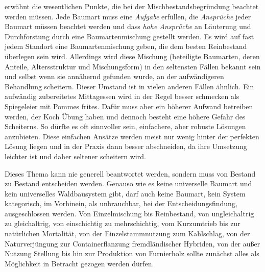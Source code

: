 \documentclass[twocolumn]{scrartcl}
\begin{document}
\citet[S.~218\,f.]{wiedemann1951Ertragskunde} erwähnt die wesentlichen Punkte,
die bei der Mischbestandsbegründung beachtet werden müssen. Jede Baumart muss
eine \emph{Aufgabe} erfüllen, die \emph{Ansprüche} jeder Baumart müssen beachtet
werden und dass \emph{hohe Ansprüche} an Läuterung und Durchforstung durch eine
Baumartenmischung gestellt werden. Es wird auf fast jedem Standort eine
Baumartenmischung geben, die dem besten Reinbestand überlegen sein wird.
Allerdings wird diese Mischung (beteiligte Baumarten, deren Anteile,
Altersstruktur und Mischungsform) in den seltensten Fällen bekannt sein und
selbst wenn sie annähernd gefunden wurde, an der aufwändigeren Behandlung
scheitern. Dieser Umstand ist in vielen anderen Fällen ähnlich. Ein aufwändig
zubereitetes Mittagessen wird in der Regel besser schmecken als Spiegeleier mit
Pommes frites. Dafür muss aber ein höherer Aufwand betreiben werden, der Koch
Übung haben und dennoch besteht eine höhere Gefahr des Scheiterns. So dürfte es
oft sinnvoller sein, einfachere, aber robuste Lösungen anzubieten. Diese
einfachen Ansätze werden meist nur wenig hinter der perfekten Lösung liegen und
in der Praxis dann besser abschneiden, da ihre Umsetzung leichter ist und daher
seltener scheitern wird.

Dieses Thema kann nie generell beantwortet werden, sondern muss von
Bestand zu Bestand entscheiden werden. Genauso wie es keine
universelle Baumart und kein universelles Waldbausystem gibt, darf
auch keine Baumart, kein System kategorisch, im Vorhinein, als
unbrauchbar, bei der Entscheidungsfindung, ausgeschlossen werden. Von
Einzelmischung bis Reinbestand, von ungleichaltrig zu gleichaltrig,
von einschichtig zu mehrschichtig, vom Kurzumtrieb bis zur natürlichen
Mortalität, von der Einzelstammnutzung zum Kahlschlag, von der
Naturverjüngung zur Containerflanzung fremdländischer Hybriden, von
der außer Nutzung Stellung bis hin zur Produktion von Furnierholz
sollte zunächst alles als Möglichkeit in Betracht gezogen werden
dürfen.




\end{document}
